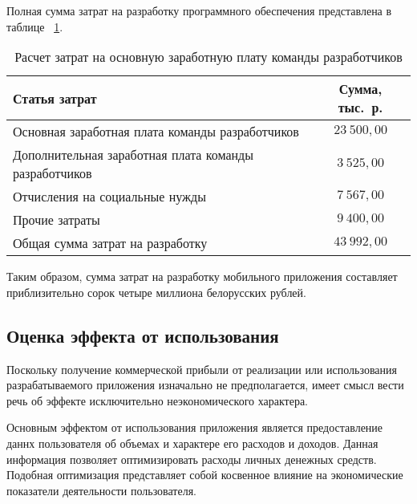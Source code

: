 Полная сумма затрат на разработку программного обеспечения представлена в таблице
~\ref{tbl:teo_sum_cost}.

\begin{table} [h!]
  \caption{
    Расчет затрат на основную заработную плату команды разработчиков
  }\label{tbl:teo_sum_cost}
  \begin{tabular}{| m{13.5cm} | c |}
    \hline

    \parbox{13.5cm}{
    \smallskip
    \centering Статья затрат
    \smallskip
    }
    &
      \parbox{2cm}{
      \smallskip
      \centering Сумма, тыс.~р.
    \smallskip
    } \\
    \hline

    Основная заработная плата команды разработчиков
    & \( 23 \: 500{,}00 \)\\
    \hline

    Дополнительная заработная плата команды разработчиков
    & \( 3 \: 525{,}00 \)\\
    \hline

    Отчисления на социальные нужды
    & \( 7 \: 567{,}00 \)\\
    \hline

    Прочие затраты
    & \( 9 \: 400{,}00 \)\\
    \hline

    Общая сумма затрат на разработку
    & \( 43 \: 992{,}00 \) \\
    \hline
  \end{tabular}
\end{table}

Таким образом, сумма затрат на разработку мобильного приложения
составляет приблизительно сорок четыре миллиона белорусских рублей.

\subsection{Оценка эффекта от использования}

Поскольку получение коммерческой прибыли от реализации или использования
разрабатываемого приложения изначально не предполагается,
имеет смысл вести речь об эффекте исключительно
неэкономического характера.

Основным эффектом от использования приложения является
предоставление даннх пользователя об объемах и характере
его расходов и доходов. Данная информация
позволяет оптимизировать расходы личных денежных средств.
Подобная оптимизация представляет собой косвенное влияние
на экономические показатели деятельности пользователя.